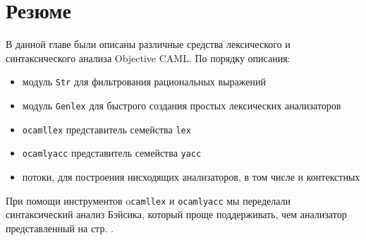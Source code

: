 \section{Резюме}

В данной главе были описаны различные средства лексического и синтаксического
анализа Objective CAML. По порядку описания:

\begin{itemize}
	\item модуль \texttt{Str} для фильтрования рациональных выражений

	\item модуль \texttt{Genlex} для быстрого создания простых лексических
анализаторов

	\item \texttt{ocamllex} представитель семейства \texttt{lex}

	\item \texttt{ocamlyacc} представитель семейства \texttt{yacc}

	\item потоки, для построения нисходящих анализаторов, в том числе и
контекстных
\end{itemize}

При помощи инструментов o\texttt{camllex} и \texttt{ocamlyacc} мы переделали
синтаксический анализ Бэйсика, который проще поддерживать, чем анализатор
представленный на стр. \pageref{??}.